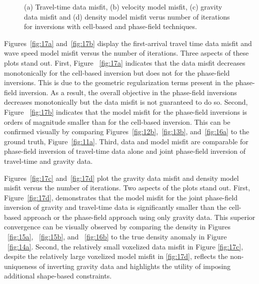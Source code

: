 \documentclass[manuscript,revised]{geophysics}
\begin{document}
{\begin{figure}
\caption{(a) Travel-time data misfit, (b) velocity model misfit, (c) gravity data misfit and (d) density model misfit verus number of iterations for inversions with cell-based and phase-field techniques.}
\label{fig:17}
\end{figure}
}

Figures~\ref{fig:17a} and~\ref{fig:17b} display the first-arrival travel time data misfit and wave speed model misfit versus the number of iterations.  Three aspects of these plots stand out.  First, Figure ~\ref{fig:17a} indicates that the data misfit decreases monotonically for the cell-based inversion but does not for the phase-field inversions.  This is due to the geometric regularization terms present in the phase-field inversion.  As a result, the overall objective in the phase-field inversions decreases monotonically but the data misfit is not guaranteed to do so.   Second, Figure ~\ref{fig:17b} indicates that the model misfit for the phase-field inversions is orders of magnitude smaller than for the cell-based inversion. This can be confirmed visually by comparing Figures~\ref{fig:12b},~\ref{fig:13b}, and~\ref{fig:16a} to the ground truth, Figure~\ref{fig:11a}.  Third, data and model misfit are comparable for phase-field inversion of travel-time data alone and joint phase-field inversion of travel-time and gravity data.   

Figures~\ref{fig:17c} and~\ref{fig:17d} plot the gravity data misfit and density model misfit versus the number of iterations. Two aspects of the plots stand out.  First, Figure~\ref{fig:17d}, demonstrates that the model misfit for the joint phase-field inversion of gravity and travel-time data is significantly smaller than the cell-based approach or the phase-field approach using only gravity data. This superior convergence can be visually observed by comparing the density in Figures ~\ref{fig:15a}, ~\ref{fig:15b}, and ~\ref{fig:16b} to the true density anomaly in Figure ~\ref{fig:14a}. Second, the relatively small voxelized data misfit in Figure \ref{fig:17c}, despite the relatively large voxelized model misfit in \ref{fig:17d}, reflects the non-uniqueness of inverting gravity data and highlights the utility of imposing additional shape-based constraints.
\end{document}

